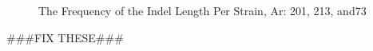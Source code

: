 \documentclass[../main.tex]{subfiles}
\begin{document}
\begin{figure}[H]
\begin{centering}
		\begin{singlespace}
			 \vspace{-0.5cm}	
	\caption[The Frequency of the Indel Length3]{The Frequency of the Indel Length Per Strain, Ar: 201, 213, and73}\label{Length_Indel_His3}
		\end{singlespace}
	\end{centering}
\end{figure}
	

###FIX THESE###
\end{document}
